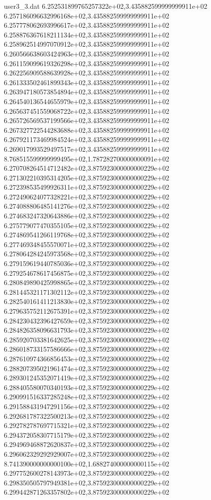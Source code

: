 \begin{filecontents}{user3_3.dat}
6.252531899765257322e+02,3.435882599999999911e+02
6.257186096632996168e+02,3.435882599999999911e+02
6.257778062693996617e+02,3.435882599999999911e+02
6.258876367618211134e+02,3.435882599999999911e+02
6.258962514997070912e+02,3.435882599999999911e+02
6.260566638603424963e+02,3.435882599999999911e+02
6.261159099619326298e+02,3.435882599999999911e+02
6.262256909588639928e+02,3.435882599999999911e+02
6.261333502461899343e+02,3.435882599999999911e+02
6.263947180573854894e+02,3.435882599999999911e+02
6.264540136544655979e+02,3.435882599999999911e+02
6.265637451559068722e+02,3.435882599999999911e+02
6.265726569537199566e+02,3.435882599999999911e+02
6.267327722544283688e+02,3.435882599999999911e+02
6.267921173469984524e+02,3.435882599999999911e+02
6.269017993529497517e+02,3.435882599999999911e+02
8.768515599999999495e+02,1.787282700000000091e+02
6.270708264514712482e+02,3.875923000000000229e+02
6.271302210395314205e+02,3.875923000000000229e+02
6.272398535499926311e+02,3.875923000000000229e+02
6.272490624077328221e+02,3.875923000000000229e+02
6.274088806485141276e+02,3.875923000000000229e+02
6.274683247320643886e+02,3.875923000000000229e+02
6.275779077470355105e+02,3.875923000000000229e+02
6.274869541266119768e+02,3.875923000000000229e+02
6.277469348455570071e+02,3.875923000000000229e+02
6.278064284245973568e+02,3.875923000000000229e+02
6.279159619440785036e+02,3.875923000000000229e+02
6.279254678617456875e+02,3.875923000000000229e+02
6.280849890425998865e+02,3.875923000000000229e+02
6.281445321171302112e+02,3.875923000000000229e+02
6.282540161411213830e+02,3.875923000000000229e+02
6.279635752112675391e+02,3.875923000000000229e+02
6.284230432396427659e+02,3.875923000000000229e+02
6.284826358096631793e+02,3.875923000000000229e+02
6.285920703381642625e+02,3.875923000000000229e+02
6.286018733157586666e+02,3.875923000000000229e+02
6.287610974366856453e+02,3.875923000000000229e+02
6.288207395021961474e+02,3.875923000000000229e+02
6.289301245352071419e+02,3.875923000000000229e+02
6.288405580070340193e+02,3.875923000000000229e+02
6.290991516337285248e+02,3.875923000000000229e+02
6.291588431947291156e+02,3.875923000000000229e+02
6.292681787322500213e+02,3.875923000000000229e+02
6.292782787697715321e+02,3.875923000000000229e+02
6.294372058307715179e+02,3.875923000000000229e+02
6.294969468872620837e+02,3.875923000000000229e+02
6.296062329292929007e+02,3.875923000000000229e+02
8.741390000000000100e+02,1.688274000000000115e+02
6.297752600278143973e+02,3.875923000000000229e+02
6.298350505797949381e+02,3.875923000000000229e+02
6.299442871263357802e+02,3.875923000000000229e+02

\end{filecontents}
